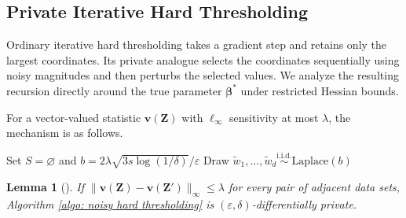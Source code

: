 \documentclass[letterpaper,12pt]{article}
\numberwithin{equation}{section}
\theoremstyle{plain}
\numberwithin{Theorem}{section}
\numberwithin{proposition}{section}
\newtheorem{Lemma}{Lemma}
\numberwithin{Lemma}{section}
{
	\theoremstyle{definition}
	\newtheorem{Definition}{Definition}
	\newtheorem{example}{Example}
	\numberwithin{example}{section}
	\newtheorem{fact}{Fact}
	\numberwithin{fact}{section}
	\newtheorem{remark}{Remark}
}
\newcommand{\furtherrev}[1]{#1}
\newcommand{\1}{\mathbbm{1}}
\def\bbeta{{\boldsymbol{\beta}}}
\begin{document}
\subsection{\texorpdfstring{\furtherrev{Private}}{Private} Iterative Hard Thresholding}\label{sec: sparse glm upper bound}

Ordinary iterative hard thresholding takes a gradient step and retains only the largest coordinates.  Its private analogue selects the coordinates sequentially using noisy magnitudes and then perturbs the selected values.  We analyze the resulting recursion directly around the true parameter $\bbeta^*$ under restricted Hessian bounds.

For a vector-valued statistic $\bm v(\bm Z)$ with $\ell_\infty$ sensitivity at most $\lambda$, the mechanism is as follows.

\begin{algorithm}[H]
	\caption{Noisy Hard Thresholding (NoisyHT)}\label{algo: noisy hard thresholding}
	\SetAlgoLined
	Set $S=\varnothing$ and $b=2\lambda\sqrt{3s\log(1/\delta)}/\varepsilon$\;
	Draw $\widetilde w_1,\ldots,\widetilde w_d\stackrel{\mathrm{i.i.d.}}{\sim}\mathrm{Laplace}(b)$\;
\end{algorithm}

\begin{Lemma}[\cite{dwork2018differentially,cai2021cost}]\label{lm: noisy hard thresholding privacy}
	If $\|\bm v(\bm Z)-\bm v(\bm Z')\|_\infty\leq\lambda$ for every pair of adjacent data sets, Algorithm \ref{algo: noisy hard thresholding} is $(\varepsilon,\delta)$-differentially private.
\end{Lemma}
\end{document}
